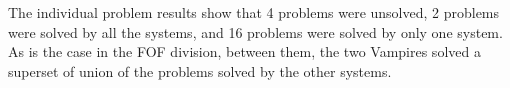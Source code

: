 \documentclass[aic]{iosart2x}
\newcommand{\THIS}{\mbox{CASC-J13}}
\begin{document}
The individual problem results show that
4 problems were unsolved,
2 problems were solved by all the systems, and
16 problems were solved by only one system.
As is the case in the FOF division, between them, the two Vampires solved a superset of union of 
the problems solved by the other systems.


% 
% 
\end{document}
